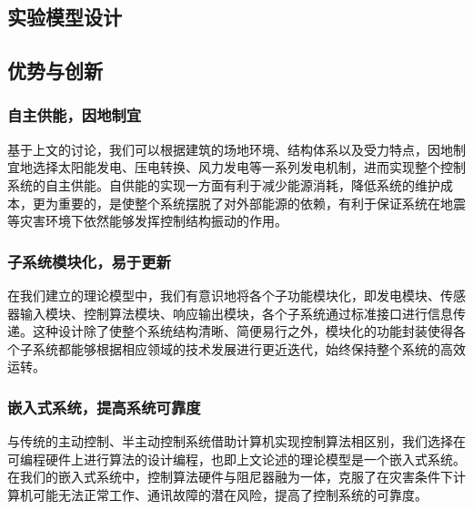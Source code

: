 \subsection{实验模型设计}

\subsection{优势与创新}

\subsubsection{自主供能，因地制宜}
基于上文的讨论，我们可以根据建筑的场地环境、结构体系以及受力特点，因地制宜地选择太阳能发电、压电转换、风力发电等一系列发电机制，进而实现整个控制系统的自主供能。自供能的实现一方面有利于减少能源消耗，降低系统的维护成本，更为重要的，是使整个系统摆脱了对外部能源的依赖，有利于保证系统在地震等灾害环境下依然能够发挥控制结构振动的作用。

\subsubsection{子系统模块化，易于更新}
在我们建立的理论模型中，我们有意识地将各个子功能模块化，即发电模块、传感器输入模块、控制算法模块、响应输出模块，各个子系统通过标准接口进行信息传递。这种设计除了使整个系统结构清晰、简便易行之外，模块化的功能封装使得各个子系统都能够根据相应领域的技术发展进行更近迭代，始终保持整个系统的高效运转。

\subsubsection{嵌入式系统，提高系统可靠度}
与传统的主动控制、半主动控制系统借助计算机实现控制算法相区别，我们选择在可编程硬件上进行算法的设计编程，也即上文论述的理论模型是一个嵌入式系统。在我们的嵌入式系统中，控制算法硬件与阻尼器融为一体，克服了在灾害条件下计算机可能无法正常工作、通讯故障的潜在风险，提高了控制系统的可靠度。
